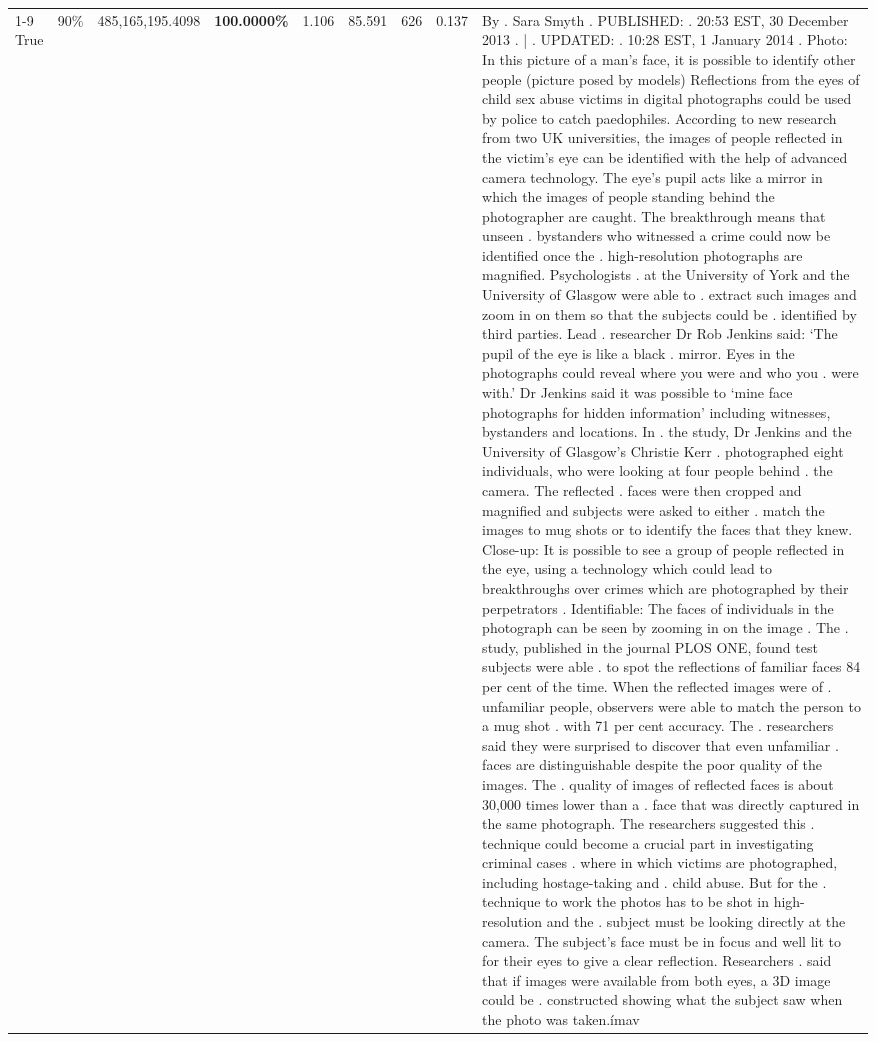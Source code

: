 \begin{table}[H]
\begin{tabular}{lllrlllll}
\cline{1-9} \cline{2-9}
True & 90\% & 485,165,195.4098 & \bfseries \color{red} 100.0000\% & 1.106 & 85.591 & 626 & 0.137 & By . Sara Smyth . PUBLISHED: . 20:53 EST, 30 December 2013 . | . UPDATED: . 10:28 EST, 1 January 2014 . Photo: In this picture of a man's face, it is possible to identify other people (picture posed by models) Reflections from the eyes of child sex abuse victims in digital photographs could be used by police to catch paedophiles. According to new research from two UK universities, the images of people reflected in the victim's eye can be identified with the help of advanced camera technology. The eye's pupil acts like a mirror in which the images of people standing behind the photographer are caught. The breakthrough means that unseen . bystanders who witnessed a crime could now be identified once the . high-resolution photographs are magnified. Psychologists . at the University of York and the University of Glasgow were able to . extract such images and zoom in on them so that the subjects could be . identified by third parties. Lead . researcher Dr Rob Jenkins said: ‘The pupil of the eye is like a black . mirror. Eyes in the photographs could reveal where you were and who you . were with.' Dr Jenkins said it was possible to ‘mine face photographs for hidden information' including witnesses, bystanders and locations. In . the study, Dr Jenkins and the University of Glasgow's Christie Kerr . photographed eight individuals, who were looking at four people behind . the camera. The reflected . faces were then cropped and magnified and subjects were asked to either . match the images to mug shots or to identify the faces that they knew. Close-up: It is possible to see a group of people reflected in the eye, using a technology which could lead to breakthroughs over crimes which are photographed by their perpetrators . Identifiable: The faces of individuals in the photograph can be seen by zooming in on the image . The . study, published in the journal PLOS ONE, found test subjects were able . to spot the reflections of familiar faces 84 per cent of the time. When the reflected images were of . unfamiliar people, observers were able to match the person to a mug shot . with 71 per cent accuracy. The . researchers said they were surprised to discover that even unfamiliar . faces are distinguishable despite the poor quality of the images. The . quality of images of reflected faces is about 30,000 times lower than a . face that was directly captured in the same photograph. The researchers suggested this . technique could become a crucial part in investigating criminal cases . where in which victims are photographed, including hostage-taking and . child abuse. But for the . technique to work the photos has to be shot in high-resolution and the . subject must be looking directly at the camera. The subject's face must be in focus and well lit to for their eyes to give a clear reflection. Researchers . said that if images were available from both eyes, a 3D image could be . constructed showing what the subject saw when the photo was taken.ímav \\

\end{tabular}
\end{table}
